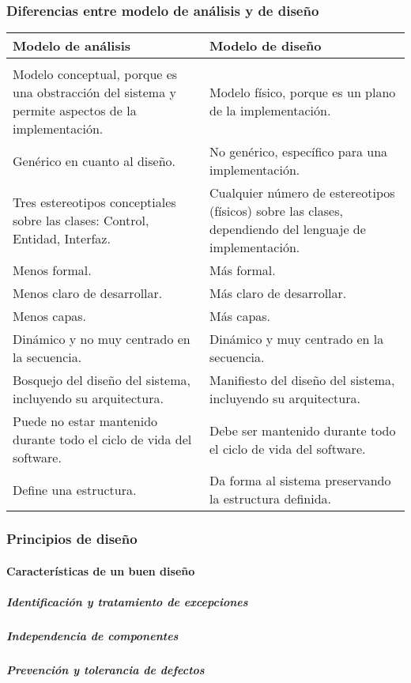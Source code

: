 \subsubsection{Diferencias entre modelo de análisis y de diseño}
\begin{center}
\begin{tabu}{p{7cm}|p{7cm}}
\rowfont{\bfseries\itshape\large} Modelo de análisis & Modelo de diseño\\
\hline
\\[2pt]

Modelo conceptual, porque es una obstracción del sistema y permite aspectos de la implementación. &
Modelo físico, porque es un plano de la implementación.\\[2pt]
Genérico en cuanto al diseño. &
No genérico, específico para una implementación.\\[2pt]
Tres estereotipos conceptiales sobre las clases: Control, Entidad, Interfaz. &
Cualquier número de estereotipos (físicos) sobre las clases, dependiendo del lenguaje de implementación.\\[2pt]
Menos formal. &
Más formal.\\[2pt]
Menos claro de desarrollar. &
Más claro de desarrollar.\\[2pt]
Menos capas.&
Más capas.\\[2pt]
Dinámico y no muy centrado en la secuencia. &
Dinámico y muy centrado en la secuencia.\\[2pt]
Bosquejo del diseño del sistema, incluyendo su arquitectura.&
Manifiesto del diseño del sistema, incluyendo su arquitectura.\\[2pt]
Puede no estar mantenido durante todo el ciclo de vida del software. &
Debe ser mantenido durante todo el ciclo de vida del software.\\[2pt]
Define una estructura. &
Da forma al sistema preservando la estructura definida.
\end{tabu}
\end{center}
\subsubsection{Principios de diseño}
\paragraph{Características de un buen diseño}
\subparagraph{Identificación y tratamiento de excepciones}
\subparagraph{Independencia de componentes}
\subparagraph{Prevención y tolerancia de defectos}
